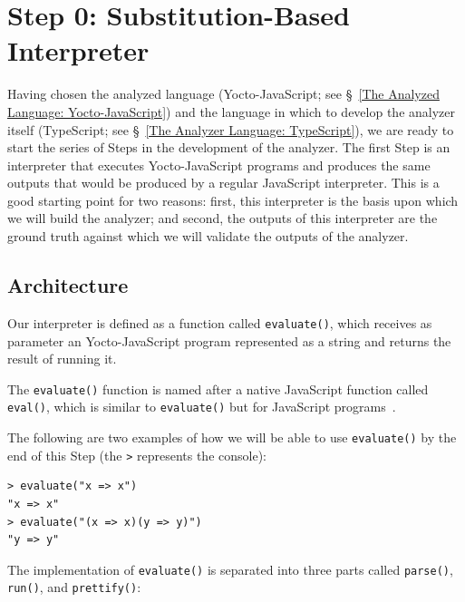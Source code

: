 \documentclass[12pt, oneside]{book}
\begin{document}
\section{Step 0: Substitution-Based Interpreter}
\label{Step 0: Substitution-Based Interpreter}

Having chosen the analyzed language (Yocto-JavaScript; see §~\ref{The Analyzed Language: Yocto-JavaScript}) and the language in which to develop the analyzer itself (TypeScript; see §~\ref{The Analyzer Language: TypeScript}), we are ready to start the series of Steps in the development of the analyzer. The first Step is an interpreter that executes Yocto-JavaScript programs and produces the same outputs that would be produced by a regular JavaScript interpreter. This is a good starting point for two reasons: first, this interpreter is the basis upon which we will build the analyzer; and second, the outputs of this interpreter are the ground truth against which we will validate the outputs of the analyzer.

\subsection{Architecture}
\label{Architecture}

Our interpreter is defined as a function called \texttt{evaluate()}, which receives as parameter an Yocto-JavaScript program represented as a string and returns the result of running it.

\begin{mdframed}[frametitle = {Advanced}]
The \texttt{evaluate()} function is named after a native JavaScript function called \texttt{eval()}, which is similar to \texttt{evaluate()} but for JavaScript programs~\cite{eval}.
\end{mdframed}

The following are two examples of how we will be able to use \texttt{evaluate()} by the end of this Step (the \texttt{>} represents the console):

\begin{verbatim}
> evaluate("x => x")
"x => x"
> evaluate("(x => x)(y => y)")
"y => y"
\end{verbatim}

The implementation of \texttt{evaluate()} is separated into three parts called \texttt{parse()}, \texttt{run()}, and \texttt{prettify()}:
\end{document}
